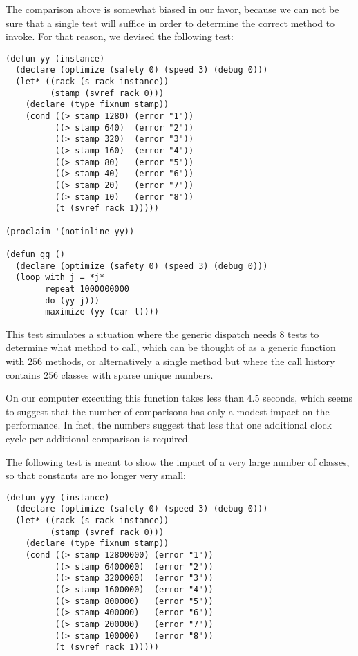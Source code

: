 {The comparison above is somewhat biased in our favor, because we can
not be sure that a single test will suffice in order to determine the
correct method to invoke.  For that reason, we devised the following
test: 

{\small\begin{verbatim}
(defun yy (instance)
  (declare (optimize (safety 0) (speed 3) (debug 0)))
  (let* ((rack (s-rack instance))
         (stamp (svref rack 0)))
    (declare (type fixnum stamp))
    (cond ((> stamp 1280) (error "1"))
          ((> stamp 640)  (error "2"))
          ((> stamp 320)  (error "3"))
          ((> stamp 160)  (error "4"))
          ((> stamp 80)   (error "5"))
          ((> stamp 40)   (error "6"))
          ((> stamp 20)   (error "7"))
          ((> stamp 10)   (error "8"))
          (t (svref rack 1)))))

(proclaim '(notinline yy))

(defun gg ()
  (declare (optimize (safety 0) (speed 3) (debug 0)))
  (loop with j = *j*
        repeat 1000000000
        do (yy j)))
        maximize (yy (car l))))
\end{verbatim}}

This test simulates a situation where the generic dispatch needs $8$
tests to determine what method to call, which can be thought of as a
generic function with $256$ methods, or alternatively a single method
but where the call history contains $256$ classes with sparse unique
numbers. 

On our computer executing this function takes less than $4.5$ seconds,
which seems to suggest that the number of comparisons has only a
modest impact on the performance.  In fact, the numbers suggest that
less that one additional clock cycle per additional comparison is
required.

The following test is meant to show the impact of a very large number
of classes, so that constants are no longer very small:

{\small\begin{verbatim}
(defun yyy (instance)
  (declare (optimize (safety 0) (speed 3) (debug 0)))
  (let* ((rack (s-rack instance))
         (stamp (svref rack 0)))
    (declare (type fixnum stamp))
    (cond ((> stamp 12800000) (error "1"))
          ((> stamp 6400000)  (error "2"))
          ((> stamp 3200000)  (error "3"))
          ((> stamp 1600000)  (error "4"))
          ((> stamp 800000)   (error "5"))
          ((> stamp 400000)   (error "6"))
          ((> stamp 200000)   (error "7"))
          ((> stamp 100000)   (error "8"))
          (t (svref rack 1)))))


\end{verbatim}}}
